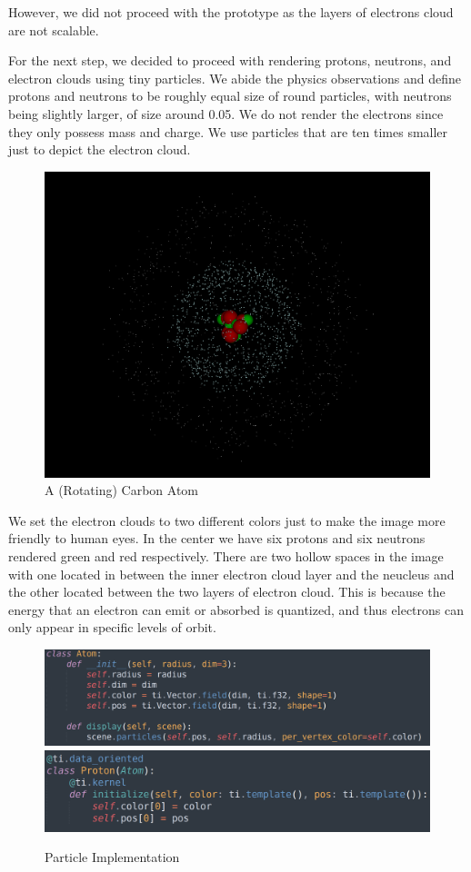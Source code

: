\documentclass[acmtog]{acmart}
\begin{document}
However, we did not proceed with the prototype as the layers of electrons cloud are not scalable.

For the next step, we decided to proceed with rendering protons, neutrons, and electron clouds using tiny particles. We abide the physics observations and define protons and neutrons to be roughly equal size of round particles, with neutrons being slightly larger, of size around 0.05. We do not render the electrons since they only possess mass and charge. We use particles that are ten times smaller just to depict the electron cloud.

\begin{figure}[h]
  \centering
  \includegraphics[width=\linewidth]{./carbon.png}
  \caption{A (Rotating) Carbon Atom}
\end{figure}

We set the electron clouds to two different colors just to make the image more friendly to human eyes. In the center we have six protons and six neutrons rendered green and red respectively. There are two hollow spaces in the image with one located in between the inner electron cloud layer and the neucleus and the other located between the two layers of electron cloud. This is because the energy that an electron can emit or absorbed is quantized, and thus electrons can only appear in specific levels of orbit. 

\begin{figure}[h]
  \centering
  \includegraphics[width=\linewidth]{./atom.png}
  \includegraphics[width=\linewidth]{./proton.png}
  \caption{Particle Implementation}
\end{figure}
\end{document}
